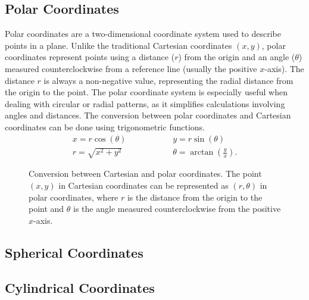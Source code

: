 \subsection{Polar Coordinates}

Polar coordinates are a two-dimensional coordinate system used to describe points in a plane. Unlike the traditional Cartesian coordinates $(x, y)$, polar coordinates represent points using a distance ($r$) from the origin and an angle ($\theta$) measured counterclockwise from a reference line (usually the positive $x$-axis). The distance $r$ is always a non-negative value, representing the radial distance from the origin to the point. The polar coordinate system is especially useful when dealing with circular or radial patterns, as it simplifies calculations involving angles and distances. The conversion between polar coordinates and Cartesian coordinates can be done using trigonometric functions.
\begin{align}
	x = r\cos(\theta) &\hspace{2cm} y = r\sin(\theta) \\
	 r = \sqrt{x^2 + y^2} &\hspace{2cm} \theta = \arctan\left(\frac{y}{x}\right).
\end{align}
\begin{figure}[htbp]
	\centering
	\caption{Conversion between Cartesian and polar coordinates. The point $(x, y)$ in Cartesian coordinates can be represented as $(r, \theta)$ in polar coordinates, where $r$ is the distance from the origin to the point and $\theta$ is the angle measured counterclockwise from the positive $x$-axis.}
	\label{fig:polar_conversion}
\end{figure}







\subsection{Spherical Coordinates}











\subsection{Cylindrical Coordinates}














